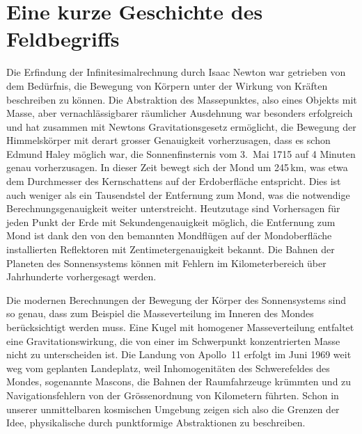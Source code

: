 %
%
%
\section{Eine kurze Geschichte des Feldbegriffs}
Die Erfindung der Infinitesimalrechnung durch Isaac Newton war getrieben
%
von dem Bedürfnis, die Bewegung von Körpern unter der Wirkung von
Kräften beschreiben zu können.
Die Abstraktion des Massepunktes, also eines Objekts mit Masse,
%
aber vernachlässigbarer räumlicher Ausdehnung war besonders erfolgreich
und hat zusammen mit Newtons Gravitationsgesetz ermöglicht, die
%
Bewegung der Himmelskörper mit derart grosser Genauigkeit vorherzusagen,
dass es schon Edmund Haley möglich war, die Sonnenfinsternis vom
3.~Mai 1715 auf 4 Minuten genau vorherzusagen.
%
In dieser Zeit bewegt sich der Mond um 245\,km, was etwa dem Durchmesser
des Kernschattens auf der Erdoberfläche entspricht.
%
Dies ist auch weniger als ein Tausendstel der Entfernung zum Mond,
was die notwendige Berechnungsgenauigkeit weiter unterstreicht.
Heutzutage sind Vorhersagen für jeden Punkt der Erde mit
Sekundengenauigkeit möglich, die Entfernung zum Mond ist dank den
von den bemannten Mondflügen auf der Mondoberfläche installierten
Reflektoren mit Zentimetergenauigkeit bekannt.
Die Bahnen der Planeten des Sonnensystems können mit Fehlern im
Kilometerbereich über Jahrhunderte vorhergesagt werden.

Die modernen Berechnungen der Bewegung der Körper des Sonnensystems
sind so genau, dass zum Beispiel die Masseverteilung im Inneren des
Mondes berücksichtigt werden muss.
%
Eine Kugel mit homogener Masseverteilung entfaltet eine
Gravitationswirkung, die von einer im Schwerpunkt konzentrierten
Masse nicht zu unterscheiden ist.
Die Landung von Apollo~11 erfolgt im Juni 1969 weit weg vom geplanten
%
Landeplatz, weil Inhomogenitäten des Schwerefeldes des Mondes,
sogenannte Mascons, die Bahnen der Raumfahrzeuge krümmten und zu
%
Navigationsfehlern von der Grössenordnung von Kilometern führten.
Schon in unserer unmittelbaren kosmischen Umgebung zeigen sich also die
Grenzen der Idee, physikalische durch punktformige Abstraktionen zu
beschreiben.

